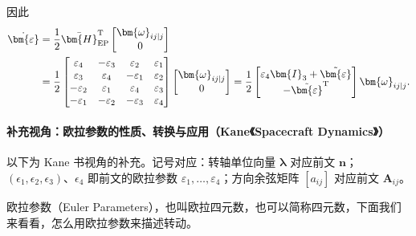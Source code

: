 因此
\begin{align}
    \dot{\bm{\varepsilon}} &= \frac{1}{2}\bar{\bm{H}}_{\mathrm{EP}}^{\mathrm{T}}
    \begin{bmatrix}
        \bm{\omega}_{ij|j}\\
        0
    \end{bmatrix}\notag\\
    &= \frac{1}{2}\begin{bmatrix}
        \varepsilon_4 & -\varepsilon_3 & \varepsilon_2 & \varepsilon_1\\
        \varepsilon_3 & \varepsilon_4 & -\varepsilon_1 & \varepsilon_2\\
        -\varepsilon_2 & \varepsilon_1 & \varepsilon_4 & \varepsilon_3\\
        -\varepsilon_1 & -\varepsilon_2 & -\varepsilon_3 & \varepsilon_4
    \end{bmatrix}
    \begin{bmatrix}
        \bm{\omega}_{ij|j}\\
        0
    \end{bmatrix}
    = \frac{1}{2}\begin{bmatrix}
        \varepsilon_4\bm{I}_3 + \tilde{\bm{\varepsilon}}\\
        -\tilde{\bm{\varepsilon}}^{\mathrm{T}}
    \end{bmatrix}
    \bm{\omega}_{ij|j}.
\end{align}

%
\paragraph*{补充视角：欧拉参数的性质、转换与应用（Kane《Spacecraft Dynamics》）}

以下为 Kane 书视角的补充。记号对应：转轴单位向量 $\bm{\lambda}$ 对应前文 $\bm{n}$；$(\epsilon_1,\epsilon_2,\epsilon_3)$、$\epsilon_4$ 即前文的欧拉参数 $\varepsilon_1,\dots,\varepsilon_4$；方向余弦矩阵 $[a_{ij}]$ 对应前文 $\bm{A}_{ij}$。

欧拉参数（Euler Parameters），也叫欧拉四元数，也可以简称四元数，下面我们来看看，怎么用欧拉参数来描述转动。

